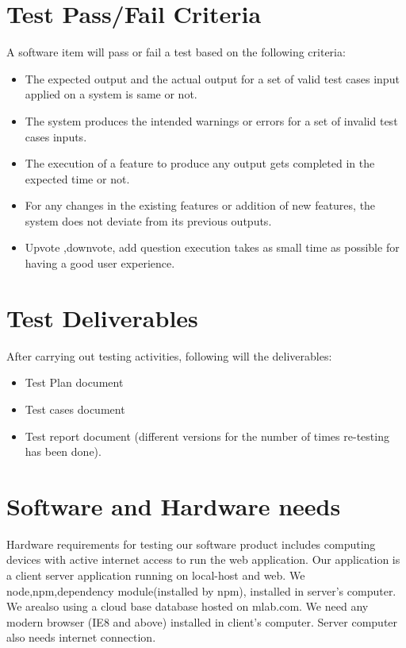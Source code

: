 \documentclass[12pt]{article}
\begin{document}
\section{Test Pass/Fail Criteria}
A software item will pass or fail a test based on the following criteria:
\begin{itemize}
    

    \item The expected output and the actual output for a set of valid test cases input applied on a system is same or not.
    \item The system produces the intended warnings or errors for a set of invalid test cases inputs.
    \item The execution of a feature to produce any output gets completed in the expected time or not.
    \item For any changes in the existing features or addition of new features, the system does not deviate from its previous outputs.
    \item Upvote ,downvote, add question execution takes as small time as possible for having a good user experience.
\end{itemize}


\section{Test Deliverables}
	After carrying out testing activities, following will the deliverables:
\begin{itemize}
    \item Test Plan document
    \item Test cases document
    \item Test report document (different versions for the number of times re-testing has been done).
\end{itemize}


\section{Software and Hardware needs}
Hardware requirements for testing our software product includes computing devices with active internet access to run the web application. Our application is a client server application running on local-host and web. We node,npm,dependency module(installed by npm), installed in server’s computer. We arealso using a cloud base database hosted on mlab.com. We need any modern browser (IE8 and above) installed in client’s computer. Server computer also needs internet connection.
\end{document}
